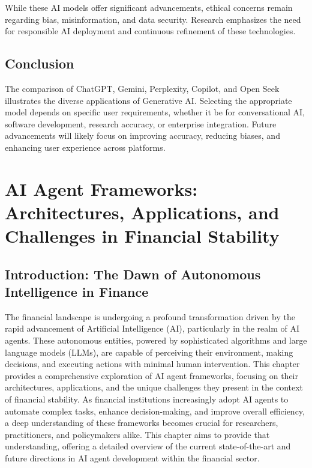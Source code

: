 \documentclass[a4paper,headinclude=on,footinclude=on,12pt,oneside]{scrbook}
\begin{document}
While these AI models offer significant advancements, ethical concerns remain regarding bias, misinformation, and data security. Research emphasizes the need for responsible AI deployment and continuous refinement of these technologies.

\section{Conclusion}

The comparison of ChatGPT, Gemini, Perplexity, Copilot, and Open Seek illustrates the diverse applications of Generative AI. Selecting the appropriate model depends on specific user requirements, whether it be for conversational AI, software development, research accuracy, or enterprise integration. Future advancements will likely focus on improving accuracy, reducing biases, and enhancing user experience across platforms.




\chapter{AI Agent Frameworks: Architectures, Applications, and Challenges in Financial Stability}

\section{Introduction: The Dawn of Autonomous Intelligence in Finance}

The financial landscape is undergoing a profound transformation driven by the rapid advancement of Artificial Intelligence (AI), particularly in the realm of AI agents. These autonomous entities, powered by sophisticated algorithms and large language models (LLMs), are capable of perceiving their environment, making decisions, and executing actions with minimal human intervention. This chapter provides a comprehensive exploration of AI agent frameworks, focusing on their architectures, applications, and the unique challenges they present in the context of financial stability. As financial institutions increasingly adopt AI agents to automate complex tasks, enhance decision-making, and improve overall efficiency, a deep understanding of these frameworks becomes crucial for researchers, practitioners, and policymakers alike. This chapter aims to provide that understanding, offering a detailed overview of the current state-of-the-art and future directions in AI agent development within the financial sector.
\end{document}
